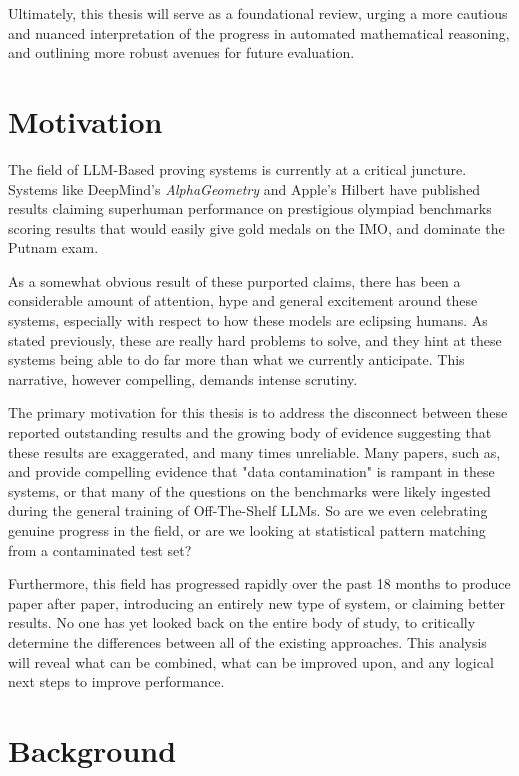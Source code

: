 \documentclass[12pt, letterpaper]{article}
\begin{document}
Ultimately, this thesis will serve as a foundational review, urging a more cautious and nuanced interpretation of the progress in automated mathematical reasoning, and outlining more robust avenues for future evaluation.
\section{Motivation}

The field of LLM-Based proving systems is currently at a critical juncture. Systems like DeepMind's \textit{AlphaGeometry} \citep{chervonyi2025goldmedalistperformancesolvingolympiad} and Apple's Hilbert \citep{varambally2025hilbertrecursivelybuildingformal} have published results claiming superhuman performance on prestigious olympiad benchmarks scoring results that would easily give gold medals on the IMO, and dominate the Putnam exam.

As a somewhat obvious result of these purported claims, there has been a considerable amount of attention, hype and general excitement around these systems, especially with respect to how these models are eclipsing humans. As stated previously, these are really hard problems to solve, and they hint at these systems being able to do far more than what we currently anticipate. This narrative, however compelling, demands intense scrutiny.

The primary motivation for this thesis is to address the disconnect between these reported outstanding results and the growing body of evidence suggesting that these results are exaggerated, and many times unreliable. Many papers, such as, \citet{khatibi2025eefsuvanewmathematicalolympiad} and \citet{balunovic2025matharena} provide compelling evidence that "data contamination" is rampant in these systems, or that many of the questions on the benchmarks were likely ingested during the general training of Off-The-Shelf LLMs. So are we even celebrating genuine progress in the field, or are we looking at statistical pattern matching from a contaminated test set?

Furthermore, this field has progressed rapidly over the past 18 months to produce paper after paper, introducing an entirely new type of system, or claiming better results. No one has yet looked back on the entire body of study, to critically determine the differences between all of the existing approaches. This analysis will reveal what can be combined, what can be improved upon, and any logical next steps to improve performance.
\section{Background}
\end{document}

